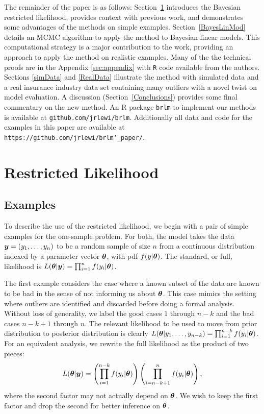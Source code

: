 \documentclass[ba]{imsart}
\def\bth{\mbox{\boldmath $\theta$}}
\newcommand{\by}{\mbox{\boldmath $y$}}
\begin{document}
The remainder of the paper is as follows: Section~\ref{restrictedlikelihood} introduces the Bayesian restricted likelihood, provides context with previous work, and demonstrates some advantages of the methods on simple examples. Section~\ref{BayesLinMod} details an MCMC algorithm to apply the method to Bayesian linear models. This computational strategy is a major contribution to the work, providing an approach to apply the method on realistic examples. Many of the the technical proofs are in the Appendix \ref{sec:appendix} with \texttt{R} code available from the authors. Sections \ref{simData} and \ref{RealData} illustrate the method with simulated data and a real insurance industry data set containing many outliers with a novel twist on model evaluation. A discussion (Section~\ref{Conclusions}) provides some final commentary on the new method. An R package \texttt{brlm} to implement our methods is available at \texttt{github.com/jrlewi/brlm}. Additionally all data and code for the examples in this paper are available at \texttt{https://github.com/jrlewi/brlm\char`_paper/}.

\section{Restricted Likelihood}
\label{restrictedlikelihood}

\subsection{Examples}
To describe the use of the restricted likelihood, 
we begin with a pair of simple examples for the one-sample problem.  For both, the model takes the data $\by=(y_1,\ldots,y_n)$ to be a random sample
of size $n$ from a continuous distribution indexed by a parameter
vector $\bth$, with pdf $f(y| \bth)$.  The standard, or full,
likelihood is $L(\bth | \by) = \prod_{i=1}^n f(y_i | \bth)$.  

The first example considers the case where a known subset of the data are known to be 
bad in the sense of not informing us about $\bth$.  This case mimics the setting where outliers are identified and discarded before doing a formal analysis.  Without loss of generality, we label the good cases $1$ through $n-k$ and the bad cases $n-k+1$ through $n$.  The relevant likelihood to be used to move from prior distribution to posterior distribution is clearly $L(\bth | y_1, \ldots, y_{n-k}) = \prod_{i=1}^{n-k} f(y_i | \bth)$.  For an equivalent analysis, we rewrite the full likelihood as the product of two pieces:
\begin{eqnarray}
\label{OutlyingCases}
L(\bth | \by)  
= \left( \prod_{i=1}^{n-k} f(y_i | \bth) \right) \left( \prod_{i=n-k+1}^{n} f(y_i | \bth) \right), 
\end{eqnarray}
where the second factor may not actually depend on $\bth$. We wish to keep the first factor and drop the second for better inference on $\bth$.
\end{document}
